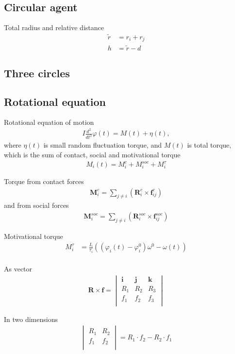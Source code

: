\subsection{Circular agent}
Total radius and relative distance
\begin{align}
\tilde{r} &= r_{i} + r_{j} \\
h &= \tilde{r} - d
\end{align}

\subsection{Three circles}




\subsection{Rotational equation}
Rotational equation of motion 
\begin{align}
I \frac{d^{2}}{d t^{2}} \varphi(t) = M(t) + \eta(t),
\end{align}
where $ \eta(t) $ is small random fluctuation torque, and $ M(t) $ is total torque, which is the sum of contact, social and motivational torque
\begin{align}
M_{i}(t) = M_{i}^{c} + M_{i}^{soc} + M_{i}^{\tau}
\end{align}

Torque from contact forces
\begin{align}
\mathbf{M}_{i}^{c} = \sum_{j\neq i}^{} \left(\mathbf{R}_{i}^{c} \times \mathbf{f}_{ij}^{c}\right)
\end{align}
and from social forces
\begin{align}
\mathbf{M}_{i}^{soc} = \sum_{j\neq i}^{} \left(\mathbf{R}_{i}^{soc} \times \mathbf{f}_{ij}^{soc}\right)
\end{align}

Motivational torque
\begin{align}
M_{i}^{\tau} &= \frac{I_{i}}{\tau_{i}} \left((\varphi_{i}(t) - \varphi_{i}^{0}) \omega^{0} - \omega(t)\right) \\
\end{align}

As vector
\begin{align}
\mathbf{R} \times \mathbf{f} =  \begin{vmatrix} \mathbf{i} & \mathbf{j} & \mathbf{k} \\ R_{1} & R_{2} & R_{3} \\ f_{1} & f_{2} & f_{3} \\ \end{vmatrix} 
\end{align}

In two dimensions
\begin{align}
\begin{vmatrix} R_{1} & R_{2} \\ f_{1} & f_{2} \\ \end{vmatrix} = R_{1} \cdot f_{2} - R_{2} \cdot f_{1}
\end{align}
